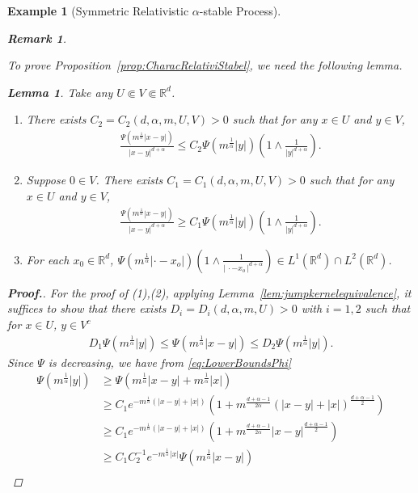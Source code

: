 \documentclass[12pt,a4paper]{article}
\newtheorem{lem}[thm]{Lemma}
\newtheorem{remark}[thm]{Remark}
\newtheorem{example}[thm]{Example}
\newcommand{\R}{\mathbb{R}}
\newcommand{\1}{{\bf 1}}
\begin{document}
\begin{example}[Symmetric Relativistic $\alpha$-stable Process]
\begin{remark}
\end{remark}
To prove Proposition~\ref{prop:CharacRelativiStabel}, we need the following lemma. 
\begin{lem}\label{lem:CharacRelativiStabel}
Take any $U\Subset V\Subset \R^d$. 
\begin{enumerate}
\item[\rm(1)] There exists $C_2=C_2(d,\alpha,m,U,V)>0$ such that for any $x\in U$ and $y\in V$, 
\begin{align*}
\frac{\Psi(m^{\frac{1}{\alpha}}|x-y|)}{|x-y|^{d+\alpha}}\leq C_2\Psi(m^{\frac{1}{\alpha}}|y|)\left(1\land\frac{1}{|y|^{d+\alpha}} \right).
\end{align*}
\item[\rm(2)] Suppose $0\in V$. There exists $C_1=C_1(d,\alpha,m,U,V)>0$ such that for any $x\in U$ and $y\in V$,
\begin{align*}
\frac{\Psi(m^{\frac{1}{\alpha}}|x-y|)}{|x-y|^{d+\alpha}}\geq C_1
\Psi(m^{\frac{1}{\alpha}}|y|)
\left(1\land\frac{1}{|y|^{d+\alpha}}\right).
\end{align*}
\item[\rm(3)] 
For each $x_0\in\R^d$, 
$\Psi(m^{\frac{1}{\alpha}}|\cdot-x_o|)\left(1\land\frac{1\;\,}{|\,\cdot-x_o\,|^{d+\alpha}} \right)\in L^1(\R^d)\cap L^2(\R^d)$.
\end{enumerate}
\end{lem}
\begin{proof}[{\bf Proof.}]
For the proof of (1),(2), 
applying Lemma~\ref{lem:jumpkernelequivalence}, it suffices to show that there exists $D_i=D_i(d,\alpha,m,U)>0$ with $i=1,2$ such that for $x\in U$, $y\in V^c$ 
\begin{align*}
D_1\Psi(m^{\frac{1}{\alpha}}|y|)\leq \Psi(m^{\frac{1}{\alpha}}|x-y|)\leq D_2\Psi(m^{\frac{1}{\alpha}}|y|).
\end{align*}
Since $\Psi$ is decreasing, we have from \eqref{eq:LowerBoundsPhi}
\begin{align*}
\Psi(m^{\frac{1}{\alpha}}|y|)&\geq 
\Psi(m^{\frac{1}{\alpha}}|x-y|+m^{\frac{1}{\alpha}}|x|)\\
&\geq C_1e^{-m^{\frac{1}{\alpha}}(|x-y|+|x|)}\left(1+m^{\frac{d+\alpha-1}{2\alpha}}(|x-y|+|x|)^{\frac{d+\alpha-1}{2}} \right)\\
&\geq C_1e^{-m^{\frac{1}{\alpha}}(|x-y|+|x|)}\left(1+m^{\frac{d+\alpha-1}{2\alpha}}|x-y|^{\frac{d+\alpha-1}{2}} \right)\\
&\geq C_1C_2^{-1}e^{-m^{\frac{1}{\alpha}}|x|}\Psi(m^{\frac{1}{\alpha}}|x-y|)\\

\end{align*}
\end{proof}
\end{example}
\end{document}
